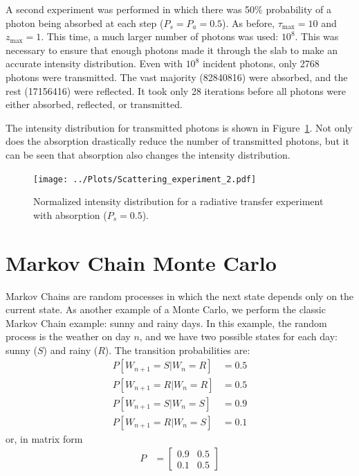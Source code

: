 \documentclass[twocolumn]{myarticle}
\newcommand{\mat}[1]{\begin{bmatrix}#1\end{bmatrix}}
\begin{document}
A second experiment was performed in which there was 50\% probability of a photon being absorbed at each step ($ P_s = P_a = 0.5 $).
As before, $ \tau_\text{max} = 10 $ and $ z_\text{max} = 1 $.
This time, a much larger number of photons was used: $ 10^8 $.
This was necessary to ensure that enough photons made it through the slab to make an accurate intensity distribution.
Even with $ 10^8 $ incident photons, only 2768 photons were transmitted.
The vast majority (82840816) were absorbed, and the rest (17156416) were reflected.
It took only 28 iterations before all photons were either absorbed, reflected, or transmitted.

The intensity distribution for transmitted photons is shown in Figure~\ref{fig:scattering_experiment_2}.
Not only does the absorption drastically reduce the number of transmitted photons, but it can be seen that absorption also changes the intensity distribution.

\begin{figure}[ht!]
    \begin{center}
    \texttt{[image: ../Plots/Scattering\_experiment\_2.pdf]}
    \caption{%
        Normalized intensity distribution for a radiative transfer experiment with absorption ($ P_s = 0.5 $).
    }
    \label{fig:scattering_experiment_2}
    \end{center}
\end{figure}

\section{Markov Chain Monte Carlo}
\label{sec:markov_chain_monte_carlo}

Markov Chains are random processes in which the next state depends only on the current state.
As another example of a Monte Carlo, we perform the classic Markov Chain example: sunny and rainy days.
In this example, the random process is the weather on day $ n $, and we have two possible states for each day: sunny ($ S $) and rainy ($ R $).
The transition probabilities are:
\begin{align}
    P[W_{n+1} = S | W_n = R] &= 0.5
    \\
    P[W_{n+1} = R | W_n = R] &= 0.5
    \\
    P[W_{n+1} = S | W_n = S] &= 0.9
    \\
    P[W_{n+1} = R | W_n = S] &= 0.1
\end{align}
or, in matrix form
\begin{align}
    P &= \mat{0.9 & 0.5 \\ 0.1 & 0.5}
\end{align}
\end{document}
